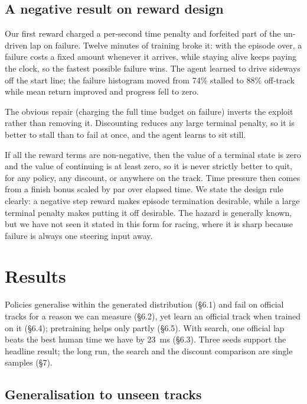 \documentclass[11pt]{article}
\begin{document}
\subsection{A negative result on reward design}

Our first reward charged a per-second time penalty and forfeited part of the un-driven lap on failure. Twelve minutes of training broke it: with the episode over, a failure costs a fixed amount whenever it arrives, while staying alive keeps paying the clock, so the fastest possible failure wins. The agent learned to drive sideways off the start line; the failure histogram moved from 74\% stalled to 88\% off-track while mean return improved and progress fell to zero.

The obvious repair (charging the full time budget on failure) inverts the exploit rather than removing it. Discounting reduces any large terminal penalty, so it is better to stall than to fail at once, and the agent learns to sit still.

If all the reward terms are non-negative, then the value of a terminal state is zero and the value of continuing is at least zero, so it is never strictly better to quit, for any policy, any discount, or anywhere on the track. Time pressure then comes from a finish bonus scaled by par over elapsed time. We state the design rule clearly: a negative step reward makes episode termination desirable, while a large terminal penalty makes putting it off desirable. The hazard is generally known, but we have not seen it stated in this form for racing, where it is sharp because failure is always one steering input away.

\section{Results}

Policies generalise within the generated distribution (\S6.1) and fail on official tracks for a reason we can measure (\S6.2), yet learn an official track when trained on it (\S6.4); pretraining helps only partly (\S6.5). With search, one official lap beats the best human time we have by 23~ms (\S6.3). Three seeds support the headline result; the long run, the search and the discount comparison are single samples (\S7).

\subsection{Generalisation to unseen tracks}
\end{document}
